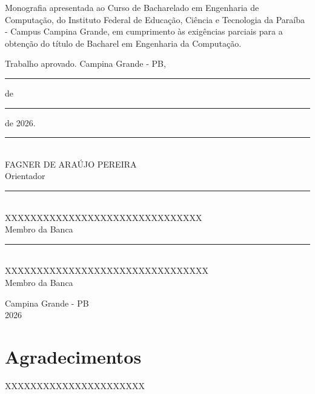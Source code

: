 \documentclass[portuguese,12pt,oneside,a4paper]{book}
\begin{document}
    \begin{center}
		\begin{minipage}{0.75\linewidth}

			Monografia apresentada ao Curso de Bacharelado em Engenharia de Computação, do Instituto Federal de Educação, Ciência e Tecnologia da Paraíba - Campus Campina Grande, em cumprimento às exigências parciais para a obtenção do título de Bacharel em Engenharia da Computação.\\

			\vskip 0.5cm

			Trabalho aprovado. Campina Grande - PB, \rule{1cm}{0.4pt} de \rule{3cm}{0.4pt} de 2026.

		\end{minipage}
    \end{center}

    \begin{center}

    	\vskip 1cm

		\rule{10cm}{0.1mm}\\
		FAGNER DE ARAÚJO PEREIRA\\
		Orientador

    	\vskip 2cm

		\rule{10cm}{0.1mm}\\
		XXXXXXXXXXXXXXXXXXXXXXXXXXXXXXX\\
		Membro da Banca

    	\vskip 2cm

		\rule{10cm}{0.1mm}\\
		XXXXXXXXXXXXXXXXXXXXXXXXXXXXXXXX\\
		Membro da Banca

		\vfill

		Campina Grande - PB\\
		2026

    \end{center}
\pagebreak


\chapter*{Agradecimentos}


	XXXXXXXXXXXXXXXXXXXXXX


\pagebreak

\newpage
\thispagestyle{empty}


        \vspace*{20.0cm}
\end{document}
